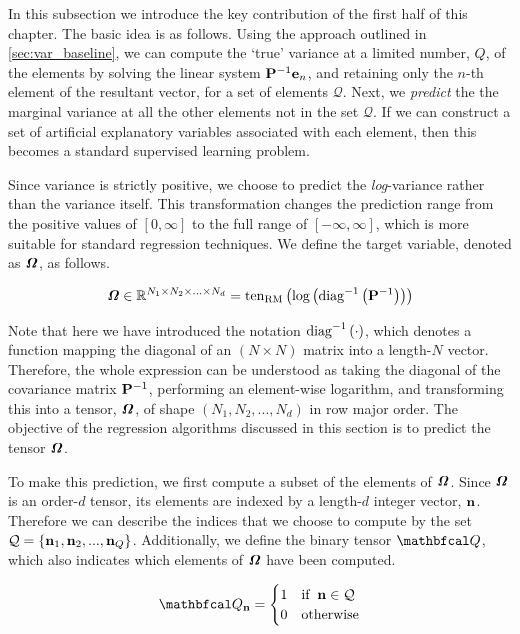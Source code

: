 In this subsection we introduce the key contribution of the first half of this chapter. The basic idea is as follows. Using the approach outlined in \cref{sec:var_baseline}, we can compute the `true' variance at a limited number, $Q$, of the elements by solving the linear system $\mathbf{P}^{-1}\mathbf{e}_n$, and retaining only the $n$-th element of the resultant vector, for a set of elements $\mathcal{Q}$. Next, we \textit{predict} the the marginal variance at all the other elements not in the set $\mathcal{Q}$. If we can construct a set of artificial explanatory variables associated with each element, then this becomes a standard supervised learning problem. 

Since variance is strictly positive, we choose to predict the \textit{log}-variance rather than the variance itself. This transformation changes the prediction range from the positive values of $[0, \infty]$ to the full range of $[-\infty, \infty]$, which is more suitable for standard regression techniques. We define the target variable, denoted as $\bm{\mathit{\Omega}}$, as follows.

\begin{equation}
    \bm{\mathit{\Omega}} \in \mathbb{R}^{N_1 \times N_2 \times ... \times N_d} = \text{\textup{ten}}_{\text{\textup{RM}}}\left(\text{log}\left(\text{\textup{diag}}^{-1}\left(\mathbf{P}^{-1}\right)\right)\right)
\end{equation}

Note that here we have introduced the notation $\text{\textup{diag}}^{-1}\left(\cdot\right)$, which denotes a function mapping the diagonal of an $(N \times N)$ matrix into a length-$N$ vector. Therefore, the whole expression can be understood as taking the diagonal of the covariance matrix $\mathbf{P}^{-1}$, performing an element-wise logarithm, and transforming this into a tensor, $\bm{\mathit{\Omega}}$,  of shape $(N_1, N_2, ..., N_d)$ in row major order. The objective of the regression algorithms discussed in this section is to predict the tensor $\bm{\mathit{\Omega}}$.

To make this prediction, we first compute a subset of the elements of $\bm{\mathit{\Omega}}$. Since $\bm{\mathit{\Omega}}$ is an order-$d$ tensor, its elements are indexed by a length-$d$ integer vector, $\mathbf{n}$. Therefore we can describe the indices that we choose to compute by the set $\mathcal{Q} = \{\mathbf{n}_1, \mathbf{n}_2, ..., \mathbf{n}_Q \}$. Additionally, we define the binary tensor $\Qt$, which also indicates which elements of $\bm{\mathit{\Omega}}$ have been computed. 

\begin{equation}
    \Qt_{\nn} = \begin{cases}
        1 & \text{if} \;\; \nn \in \mathcal{Q} \\
        0 & \text{otherwise}
    \end{cases}
\end{equation}


